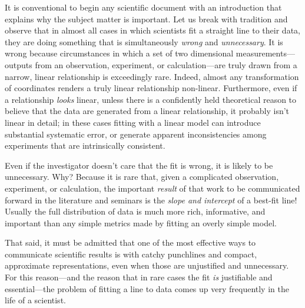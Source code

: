 \documentclass[12pt,twoside]{article}
\newcounter{problem}
\begin{document}
It is conventional to begin any scientific document with an
introduction that explains why the subject matter is important.  Let
us break with tradition and observe that in almost all cases in which
scientists fit a straight line to their data, they are doing something
that is simultaneously \emph{wrong} and \emph{unnecessary}.  It is
wrong because circumstances in which a set of two dimensional
measurements---outputs from an observation, experiment, or
calculation---are truly drawn from a narrow, linear relationship is
exceedingly rare.  Indeed, almost any transformation of coordinates
renders a truly linear relationship non-linear.  Furthermore, even if
a relationship \emph{looks} linear, unless there is a confidently held
theoretical reason to believe that the data are generated from a
linear relationship, it probably isn't linear in detail; in these
cases fitting with a linear model can introduce substantial systematic
error, or generate apparent inconsistencies among experiments that are
intrinsically consistent.

Even if the investigator doesn't care that the fit is wrong, it is
likely to be unnecessary.  Why?  Because it is rare that, given a
complicated observation, experiment, or calculation, the important
\emph{result} of that work to be communicated forward in the
literature and seminars is the \emph{slope and intercept} of a
best-fit line!  Usually the full distribution of data is much more
rich, informative, and important than any simple metrics made by
fitting an overly simple model.

That said, it must be admitted that one of the most effective ways to
communicate scientific results is with catchy punchlines and compact,
approximate representations, even when those are unjustified and
unnecessary.  For this reason---and the reason that in rare cases the
fit \emph{is} justifiable and essential---the problem of fitting a
line to data comes up very frequently in the life of a scientist.
\end{document}
